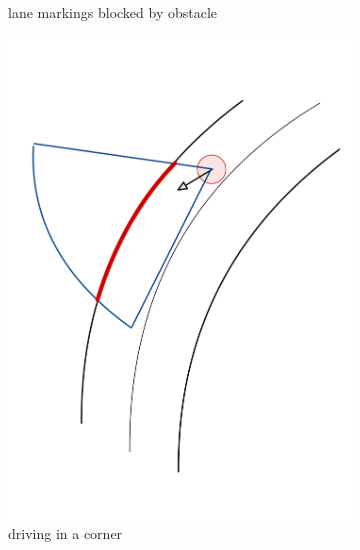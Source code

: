 \begin{figure}
\begin{subfigure}{.24\linewidth}
		\caption{lane markings blocked by obstacle}
	\end{subfigure}
	\begin{subfigure}{.24\linewidth}
		\includegraphics[width=\textwidth]{Pictures/road detection angle}
		\caption{driving in a corner}
	\end{subfigure}	
	\begin{subfigure}{.24\linewidth}

\end{subfigure}
\end{figure}
